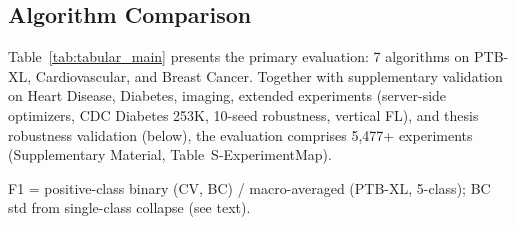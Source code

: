 \documentclass[conference]{IEEEtran}
\begin{document}
\subsection{Algorithm Comparison}

Table~\ref{tab:tabular_main} presents the primary evaluation: 7 algorithms on PTB-XL, Cardiovascular, and Breast Cancer. Together with supplementary validation on Heart Disease, Diabetes, imaging, extended experiments (server-side optimizers, CDC Diabetes 253K, 10-seed robustness, vertical FL), and thesis robustness validation (below), the evaluation comprises 5,477+ experiments (Supplementary Material, Table~S-ExperimentMap).

\begin{table}[htbp]
\centering
\caption{FL Algorithm Comparison on Real Clinical Datasets (7 Algorithms $\times$ 3 Datasets). Best accuracy per dataset in \textbf{bold}. Mean $\pm$ std over 5 seeds. PX = PTB-XL ECG (5 clients, 5-class, site-based), CV = Cardiovascular (5 clients, binary, $\alpha$=0.5), BC = Breast Cancer (3 clients, binary, $\alpha$=0.5).}
\label{tab:tabular_main}
\par{\footnotesize F1 = positive-class binary (CV, BC) / macro-averaged (PTB-XL, 5-class); BC std from single-class collapse (see text).}
\end{table}
\end{document}
